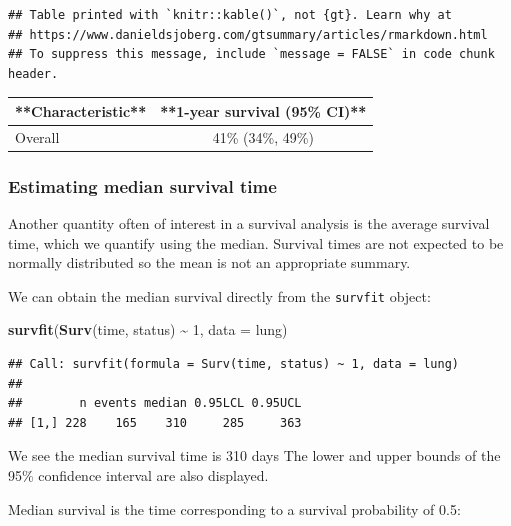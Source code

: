 \documentclass[
]{book}
\newenvironment{Shaded}{\begin{snugshade}}{\end{snugshade}}
\newcommand{\AttributeTok}[1]{\textcolor[rgb]{0.13,0.29,0.53}{#1}}
\newcommand{\DecValTok}[1]{\textcolor[rgb]{0.00,0.00,0.81}{#1}}
\newcommand{\FunctionTok}[1]{\textcolor[rgb]{0.13,0.29,0.53}{\textbf{#1}}}
\newcommand{\NormalTok}[1]{#1}
\newcommand{\SpecialCharTok}[1]{\textcolor[rgb]{0.81,0.36,0.00}{\textbf{#1}}}
\begin{document}
\begin{verbatim}
## Table printed with `knitr::kable()`, not {gt}. Learn why at
## https://www.danieldsjoberg.com/gtsummary/articles/rmarkdown.html
## To suppress this message, include `message = FALSE` in code chunk header.
\end{verbatim}

\begin{tabular}{l|c}
\hline
**Characteristic** & **1-year survival (95\% CI)**\\
\hline
Overall & 41\% (34\%, 49\%)\\
\hline
\end{tabular}

\hypertarget{estimating-median-survival-time}{%
\subsubsection{Estimating median survival time}\label{estimating-median-survival-time}}

Another quantity often of interest in a survival analysis is the average survival time, which we quantify using the median. Survival times are not expected to be normally distributed so the mean is not an appropriate summary.

We can obtain the median survival directly from the \texttt{survfit} object:

\begin{Shaded}
\begin{Highlighting}[]
\FunctionTok{survfit}\NormalTok{(}\FunctionTok{Surv}\NormalTok{(time, status) }\SpecialCharTok{\textasciitilde{}} \DecValTok{1}\NormalTok{, }\AttributeTok{data =}\NormalTok{ lung)}
\end{Highlighting}
\end{Shaded}

\begin{verbatim}
## Call: survfit(formula = Surv(time, status) ~ 1, data = lung)
## 
##        n events median 0.95LCL 0.95UCL
## [1,] 228    165    310     285     363
\end{verbatim}

We see the median survival time is 310 days The lower and upper bounds of the 95\% confidence interval are also displayed.

Median survival is the time corresponding to a survival probability of 0.5:
\end{document}
